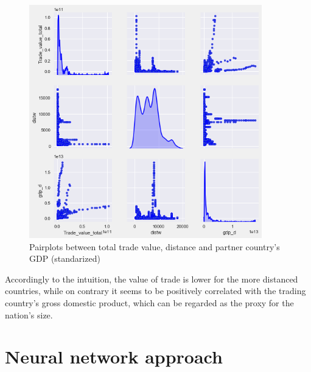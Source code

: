 \documentclass{Trade_template}
\numberwithin{equation}{section}
\begin{document}
\newpage

\begin{figure}[H]
\centering
\includegraphics[width=0.9\textwidth]{Pairplots}
\caption[Pairplots]{Pairplots between total trade value, distance and partner country's GDP (standarized)}
\end{figure} 

Accordingly to the intuition, the value of trade is lower for the more distanced countries, while on contrary it seems to be positively correlated with the trading country's gross domestic product, which can be regarded as the proxy for the nation's size.

\chapter{Neural network approach}
\end{document}
